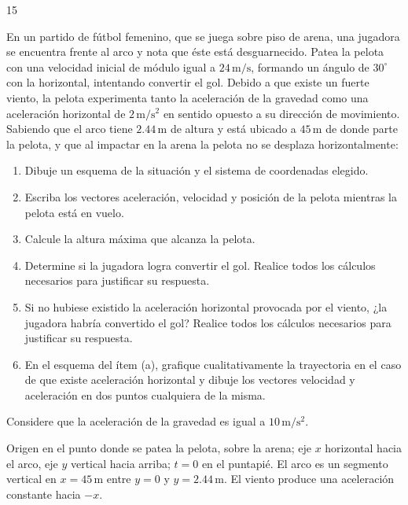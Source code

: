 \documentclass{hoja-ejercicio}
\newcommand{\un}[1]{\,\mathrm{#1}}
\newcommand{\ms}{\un{m/s}}
\newcommand{\mss}{\un{m/s^2}}
\begin{document}
\begin{hoja}[2]{15}

\begin{ejercicio}
En un partido de fútbol femenino, que se juega sobre piso de arena, una jugadora se encuentra frente al arco y nota que éste está desguarnecido. Patea la pelota con una velocidad inicial de módulo igual a $24\ms$, formando un ángulo de $30^\circ$ con la horizontal, intentando convertir el gol. Debido a que existe un fuerte viento, la pelota experimenta tanto la aceleración de la gravedad como una aceleración horizontal de $2\mss$ en sentido opuesto a su dirección de movimiento. Sabiendo que el arco tiene $2.44\un{m}$ de altura y está ubicado a $45\un{m}$ de donde parte la pelota, y que al impactar en la arena la pelota no se desplaza horizontalmente:
\begin{enumerate}[label=(\alph*), leftmargin=*, itemsep=1pt, topsep=3pt]
\item Dibuje un esquema de la situación y el sistema de coordenadas elegido.
\item Escriba los vectores aceleración, velocidad y posición de la pelota mientras la pelota está en vuelo.
\item Calcule la altura máxima que alcanza la pelota.
\item Determine si la jugadora logra convertir el gol. Realice todos los cálculos necesarios para justificar su respuesta.
\item Si no hubiese existido la aceleración horizontal provocada por el viento, ¿la jugadora habría convertido el gol? Realice todos los cálculos necesarios para justificar su respuesta.
\item En el esquema del ítem (a), grafique cualitativamente la trayectoria en el caso de que existe aceleración horizontal y dibuje los vectores velocidad y aceleración en dos puntos cualquiera de la misma.
\end{enumerate}
Considere que la aceleración de la gravedad es igual a $10\mss$.
\end{ejercicio}

\begin{solucion}

Origen en el punto donde se patea la pelota, sobre la arena; eje $x$ horizontal hacia el arco, eje $y$ vertical hacia arriba; $t=0$ en el puntapié. El arco es un segmento vertical en $x=45\un{m}$ entre $y=0$ y $y=2.44\un{m}$. El viento produce una aceleración constante hacia $-x$.


\end{solucion}
\end{hoja}
\end{document}

